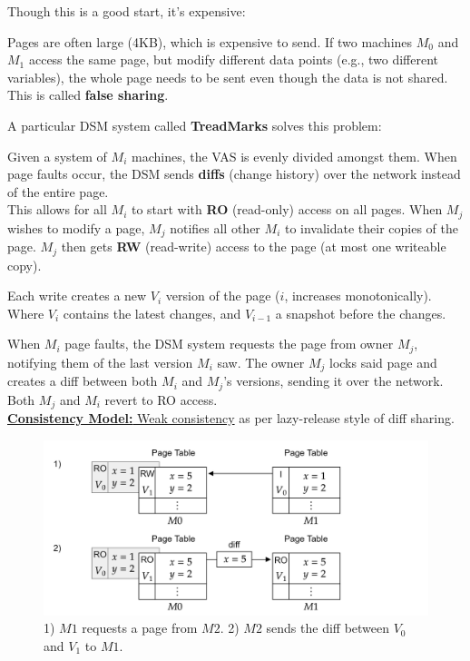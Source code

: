 \newpage 

\noindent
Though this is a good start, it's expensive:

\begin{theo}

    Pages are often large (4KB), which is expensive to send.
    If two machines $M_0$ and $M_1$ access the same page, but modify different data points (e.g., two different variables),
    the whole page needs to be sent even though the data is not shared. This is called \textbf{false sharing}.
\end{theo}

\noindent
A particular DSM system called \textbf{TreadMarks} solves this problem:
\begin{Def}

    Given a system of $M_i$ machines, the VAS is evenly divided amongst them.
    When page faults occur, the DSM sends \textbf{diffs} (change history) over the network instead of the entire page.\\

    \noindent
    This allows for all $M_i$ to start with \textbf{RO} (read-only) access on all pages. When $M_j$ wishes to 
    modify a page, $M_j$ notifies all other $M_i$ to invalidate their copies of the page. $M_j$ then gets \textbf{RW} (read-write) access to the page (at most one writeable copy).


    Each write creates a new $V_i$ version of the page ($i$, increases monotonically). Where $V_i$ contains the latest changes, and $V_{i-1}$ a snapshot before the changes.
    
    When $M_i$ page faults, the DSM system requests the page from owner $M_j$, notifying them of the last version $M_i$ saw. The owner $M_j$ locks said page and creates a diff between both $M_i$ and $M_j$'s versions, sending it over the network.
    Both $M_j$ and $M_i$ revert to RO access.\\

    \noindent
    \underline{\textbf{Consistency Model:} Weak consistency} as per lazy-release style of diff sharing.
\end{Def}

\vspace{-1em}
\begin{figure}[h]
    \centering
    \includegraphics[width=\textwidth]{Sections/shared/tread.png}
    \caption{1) $M1$ requests a page from $M2$. 2) $M2$ sends the diff between $V_0$ and $V_1$ to $M1$.}
    \label{fig:dsm}
\end{figure}

